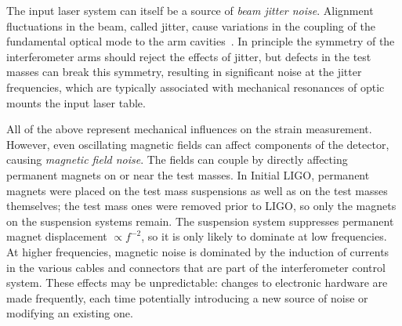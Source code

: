 The input laser system can itself be a source of \textit{beam jitter noise}.
Alignment fluctuations in the beam, called jitter, cause variations in the coupling of the fundamental optical mode to the arm cavities~\citep{Mueller_2005, Hardwick_2019}.
In principle the symmetry of the interferometer arms should reject the effects of jitter, but defects in the test masses can break this symmetry, resulting in significant noise at the jitter frequencies, which are typically associated with mechanical resonances of optic mounts the input laser table.

All of the above represent mechanical influences on the strain measurement.
However, even oscillating magnetic fields can affect components of the detector, causing \textit{magnetic field noise}.
The fields can couple by directly affecting permanent magnets on or near the test masses.
In Initial LIGO, permanent magnets were placed on the test mass suspensions as well as on the test masses themselves; the test mass ones were removed prior to \ac{LIGO}, so only the magnets on the suspension systems remain.
The suspension system suppresses permanent magnet displacement $\propto f^{-2}$, so it is only likely to dominate at low frequencies.
At higher frequencies, magnetic noise is dominated by the induction of currents in the various cables and connectors that are part of the interferometer control system.
These effects may be unpredictable: changes to electronic hardware are made frequently, each time potentially introducing a new source of noise or modifying an existing one.
